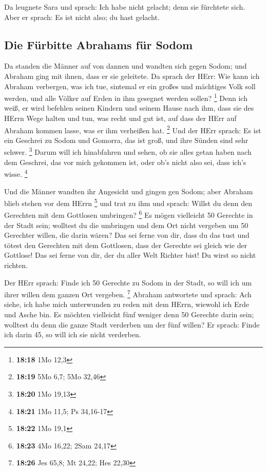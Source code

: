  Da leugnete Sara und sprach: Ich habe nicht gelacht;
denn sie fürchtete sich. Aber er sprach: Es ist nicht also; du hast
gelacht.

\hypertarget{die-fuxfcrbitte-abrahams-fuxfcr-sodom}{%
\subsection{Die Fürbitte Abrahams für
Sodom}\label{die-fuxfcrbitte-abrahams-fuxfcr-sodom}}

 Da standen die Männer auf von dannen und wandten sich
gegen Sodom; und Abraham ging mit ihnen, dass er sie geleitete.
 Da sprach der HErr: Wie kann ich Abraham verbergen, was
ich tue,  sintemal er ein großes und mächtiges Volk soll
werden, und alle Völker auf Erden in ihm gesegnet werden sollen?
\footnote{\textbf{18:18} 1Mo 12,3}  Denn ich weiß, er
wird befehlen seinen Kindern und seinem Hause nach ihm, dass sie des
HErrn Wege halten und tun, was recht und gut ist, auf dass der HErr auf
Abraham kommen lasse, was er ihm verheißen hat. \footnote{\textbf{18:19}
  5Mo 6,7; 5Mo 32,46}  Und der HErr sprach: Es ist ein
Geschrei zu Sodom und Gomorra, das ist groß, und ihre Sünden sind sehr
schwer. \footnote{\textbf{18:20} 1Mo 19,13}  Darum will
ich hinabfahren und sehen, ob sie alles getan haben nach dem Geschrei,
das vor mich gekommen ist, oder ob's nicht also sei, dass ich's wisse.
\footnote{\textbf{18:21} 1Mo 11,5; Ps 34,16-17}

 Und die Männer wandten ihr Angesicht und gingen gen
Sodom; aber Abraham blieb stehen vor dem HErrn \footnote{\textbf{18:22}
  1Mo 19,1}  und trat zu ihm und sprach: Willst du denn
den Gerechten mit dem Gottlosen umbringen? \footnote{\textbf{18:23} 4Mo
  16,22; 2Sam 24,17}  Es mögen vielleicht 50 Gerechte in
der Stadt sein; wolltest du die umbringen und dem Ort nicht vergeben um
50 Gerechter willen, die darin wären?  Das sei ferne von
dir, dass du das tust und tötest den Gerechten mit dem Gottlosen, dass
der Gerechte sei gleich wie der Gottlose! Das sei ferne von dir, der du
aller Welt Richter bist! Du wirst so nicht richten.

 Der HErr sprach: Finde ich 50 Gerechte zu Sodom in der
Stadt, so will ich um ihrer willen dem ganzen Ort vergeben. \footnote{\textbf{18:26}
  Jes 65,8; Mt 24,22; Hes 22,30}  Abraham antwortete und
sprach: Ach siehe, ich habe mich unterwunden zu reden mit dem HErrn,
wiewohl ich Erde und Asche bin.  Es möchten vielleicht
fünf weniger denn 50 Gerechte darin sein; wolltest du denn die ganze
Stadt verderben um der fünf willen? Er sprach: Finde ich darin 45, so
will ich sie nicht verderben.

